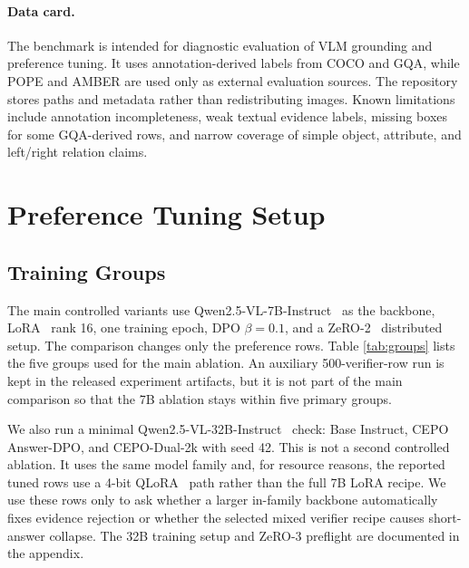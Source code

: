 \documentclass[10pt,twocolumn,letterpaper]{article}
\newcommand{\answerdpo}{CEPO Answer-DPO}
\newcommand{\dualtwok}{CEPO-Dual-2k}
\begin{document}
\paragraph{Data card.}
The benchmark is intended for diagnostic evaluation of VLM grounding and
preference tuning. It uses annotation-derived labels from COCO and GQA, while
POPE and AMBER are used only as external evaluation sources. The repository
stores paths and metadata rather than redistributing images. Known limitations
include annotation incompleteness, weak textual evidence labels, missing boxes
for some GQA-derived rows, and narrow coverage of simple object, attribute,
and left/right relation claims.

\section{Preference Tuning Setup}

\subsection{Training Groups}

The main controlled variants use Qwen2.5-VL-7B-Instruct~\cite{qwen25vl} as the
backbone, LoRA~\cite{lora} rank 16, one training epoch, DPO $\beta=0.1$, and a
ZeRO-2~\cite{zero} distributed setup. The comparison changes only the
preference rows. Table \ref{tab:groups} lists the five groups used for the
main ablation. An
auxiliary 500-verifier-row run is kept in the released experiment artifacts,
but it is not part of the main comparison so that the 7B ablation stays within
five primary groups.

We also run a minimal Qwen2.5-VL-32B-Instruct~\cite{qwen25vl32b} check: Base
Instruct, \answerdpo{}, and \dualtwok{} with seed 42. This is not a second
controlled ablation. It uses the same model family and, for resource reasons,
the reported tuned rows use a 4-bit QLoRA~\cite{qlora} path rather than the
full 7B LoRA recipe. We use these rows only to ask whether a larger in-family
backbone automatically fixes evidence rejection or whether the selected mixed
verifier recipe causes short-answer collapse. The 32B training setup and
ZeRO-3 preflight are documented in the appendix.
\end{document}
